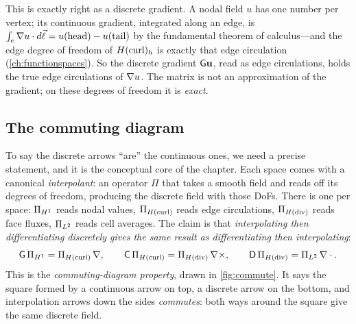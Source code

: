 This is exactly right as a discrete gradient. A nodal field $u$ has one number per
vertex; its continuous gradient, integrated along an edge, is
$\int_e\nabla u\cdot d\vec\ell = u(\operatorname{head}) - u(\operatorname{tail})$ by
the fundamental theorem of calculus---and the edge degree of freedom of $H(\mathrm{curl})_h$ is
exactly that edge circulation (\cref{ch:functionspaces}). So the discrete gradient
$\mathsf{G}\mathbf{u}$, read as edge circulations, holds the true edge circulations of
$\nabla u$. The matrix is not an approximation of the gradient; on these degrees of
freedom it is \emph{exact}.

\subsection{The commuting diagram}

To say the discrete arrows ``are'' the continuous ones, we need a precise statement,
and it is the conceptual core of the chapter. Each space comes with a canonical
\emph{interpolant}: an operator $\Pi$ that takes a smooth field and reads off its
degrees of freedom, producing the discrete field with those DoFs. There is one per
space: $\Pi_{H^1}$ reads nodal values, $\Pi_{H(\mathrm{curl})}$ reads edge circulations,
$\Pi_{H(\mathrm{div})}$ reads face fluxes, $\Pi_{L^2}$ reads cell averages. The claim is that
\emph{interpolating then differentiating discretely gives the same result as
differentiating then interpolating}:
\[
  \mathsf{G}\,\Pi_{H^1} = \Pi_{H(\mathrm{curl})}\,\nabla, \qquad
  \mathsf{C}\,\Pi_{H(\mathrm{curl})} = \Pi_{H(\mathrm{div})}\,\nabla\times, \qquad
  \mathsf{D}\,\Pi_{H(\mathrm{div})} = \Pi_{L^2}\,\nabla\cdot.
\]
This is the \emph{commuting-diagram property}, drawn in \cref{fig:commute}. It says
the square formed by a continuous arrow on top, a discrete arrow on the bottom, and
interpolation arrows down the sides \emph{commutes}: both ways around the square give
the same discrete field.

